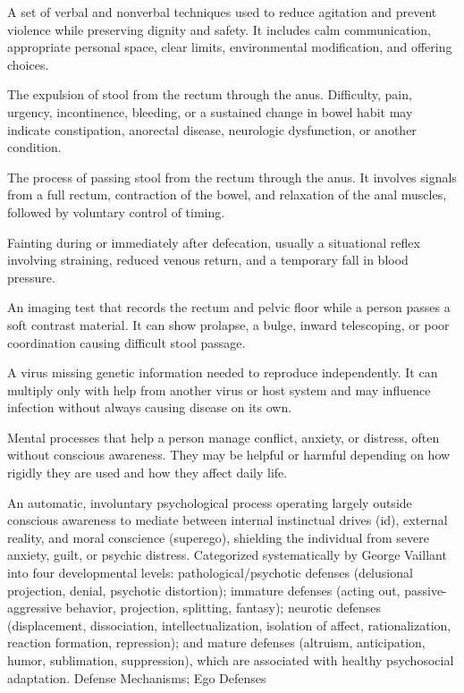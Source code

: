  A set of verbal and nonverbal techniques used to reduce agitation and prevent violence
while preserving dignity and safety. It includes calm communication, appropriate
personal space, clear limits, environmental modification, and offering choices.

 The expulsion of stool from the rectum through the anus. Difficulty, pain, urgency, incontinence, bleeding, or a sustained change in bowel habit may indicate constipation, anorectal disease, neurologic dysfunction, or another condition.

 The process of passing stool from the rectum through the anus. It involves signals from a full rectum, contraction of the bowel, and relaxation of the anal muscles, followed by voluntary control of timing.

 Fainting during or immediately after defecation, usually a situational reflex involving straining, reduced venous return, and a temporary fall in blood pressure.

 An imaging test that records the rectum and pelvic floor while a person passes a soft contrast material. It can show prolapse, a bulge, inward telescoping, or poor coordination causing difficult stool passage.

 A virus missing genetic information needed to reproduce independently. It can multiply only with help from another virus or host system and may influence infection without always causing disease on its own.

 Mental processes that help a person manage conflict, anxiety, or distress, often without conscious awareness. They may be helpful or harmful depending on how rigidly they are used and how they affect daily life.

 An automatic, involuntary psychological process operating largely outside conscious awareness to mediate between internal instinctual drives (id), external reality, and moral conscience (superego), shielding the individual from severe anxiety, guilt, or psychic distress. Categorized systematically by George Vaillant into four developmental levels: pathological/psychotic defenses (delusional projection, denial, psychotic distortion); immature defenses (acting out, passive-aggressive behavior, projection, splitting, fantasy); neurotic defenses (displacement, dissociation, intellectualization, isolation of affect, rationalization, reaction formation, repression); and mature defenses (altruism, anticipation, humor, sublimation, suppression), which are associated with healthy psychosocial adaptation.
\synonyms
Defense Mechanisms; Ego Defenses

